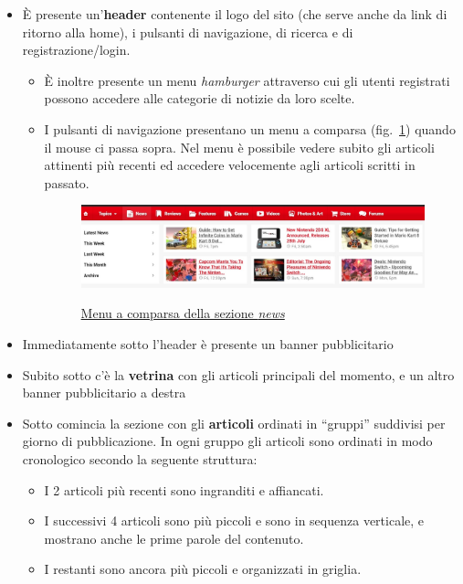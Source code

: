 \documentclass[12pt, a4paper,titlepage]{article}
\begin{document}
\begin{itemize}
    \item È presente un'\textbf{header} contenente il logo del sito (che serve anche da link di ritorno alla home), i pulsanti di navigazione, di ricerca e di registrazione/login.
    \begin{itemize}
        \item È inoltre presente un menu \emph{hamburger} attraverso cui gli utenti registrati possono accedere alle categorie di notizie da loro scelte.
        \item I pulsanti di navigazione presentano un menu a comparsa (fig.~\ref{fig:menu-nav}) quando il mouse ci passa sopra. Nel menu è possibile vedere subito gli articoli attinenti più recenti ed accedere velocemente agli articoli scritti in passato.
        \begin{figure}[h]
            \centering
            \href{pic/menu_nav.jpg}{\includegraphics[width=\textwidth]{menu_nav}}
            \label{fig:menu-nav}
            \caption{\href{pic/menu_nav.jpg}{Menu a comparsa della sezione \emph{news}}}
        \end{figure}
    \end{itemize}
    \item Immediatamente sotto l'header è presente un banner pubblicitario
    \item Subito sotto c'è la \textbf{vetrina} con gli articoli principali del momento, e un altro banner pubblicitario a destra
    \item Sotto comincia la sezione con gli \textbf{articoli} ordinati in ``gruppi'' suddivisi per giorno di pubblicazione. In ogni gruppo gli articoli sono ordinati in modo cronologico secondo la seguente struttura:
    \begin{itemize}
        \item I 2 articoli più recenti sono ingranditi e affiancati.
        \item I successivi 4 articoli sono più piccoli e sono in sequenza verticale, e mostrano anche le prime parole del contenuto.
        \item I restanti sono ancora più piccoli e organizzati in griglia.
    \end{itemize}

\end{itemize}
\end{document}

